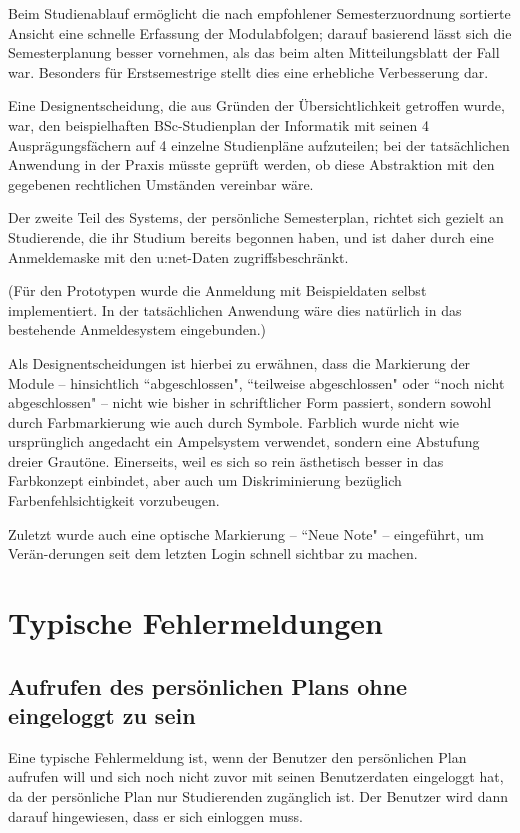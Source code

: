 \documentclass[a4paper,10pt]{scrartcl}
\begin{document}
Beim Studienablauf ermöglicht die nach empfohlener Semesterzuordnung sortierte Ansicht eine schnelle Erfassung der Modulabfolgen; darauf basierend lässt sich die Semesterplanung besser vornehmen, als das beim alten Mitteilungsblatt der Fall war. Besonders für Erstsemestrige stellt dies eine erhebliche Verbesserung dar.

Eine Designentscheidung, die aus Gründen der Übersichtlichkeit getroffen wurde, war, den beispielhaften BSc-Studienplan der Informatik mit seinen 4 Ausprägungsfächern auf 4 einzelne Studienpläne aufzuteilen; bei der tatsächlichen Anwendung in der Praxis müsste geprüft werden, ob diese Abstraktion mit den gegebenen rechtlichen Umständen vereinbar wäre.

Der zweite Teil des Systems, der persönliche Semesterplan, richtet sich gezielt an Studierende, die ihr Studium bereits begonnen haben, und ist daher durch eine Anmeldemaske mit den u:net-Daten zugriffsbeschränkt.

(Für den Prototypen wurde die Anmeldung mit Beispieldaten selbst implementiert. In der tatsächlichen Anwendung wäre dies natürlich in das bestehende Anmeldesystem eingebunden.)

Als Designentscheidungen ist hierbei zu erwähnen, dass die Markierung der Module – hinsichtlich ``abgeschlossen", ``teilweise abgeschlossen" oder ``noch nicht abgeschlossen" – nicht wie bisher in schriftlicher Form passiert, sondern sowohl durch Farbmarkierung wie auch durch Symbole. Farblich wurde nicht wie ursprünglich angedacht ein Ampelsystem verwendet, sondern eine Abstufung dreier Grautöne. Einerseits, weil es sich so rein ästhetisch besser in das Farbkonzept einbindet, aber auch um Diskriminierung bezüglich Farbenfehlsichtigkeit vorzubeugen.

Zuletzt wurde auch eine optische Markierung – ``Neue Note" – eingeführt, um Verän-derungen seit dem letzten Login schnell sichtbar zu machen.

\section{Typische Fehlermeldungen}

\subsection{Aufrufen des persönlichen Plans ohne eingeloggt zu sein}

Eine typische Fehlermeldung ist, wenn der Benutzer den persönlichen Plan aufrufen will und sich noch nicht zuvor mit seinen Benutzerdaten eingeloggt hat,
da der persönliche Plan nur Studierenden zugänglich ist. Der Benutzer wird dann darauf hingewiesen, dass er sich einloggen muss.
\end{document}
